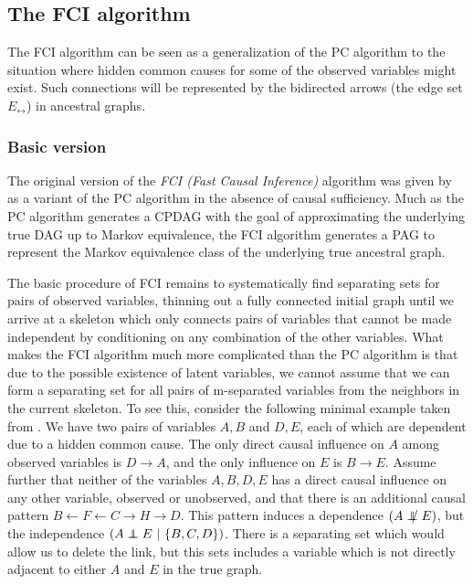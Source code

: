 \subsection{The FCI algorithm}
The FCI algorithm can be seen as a generalization of the PC algorithm to the situation where hidden common causes for some of the observed variables might exist. Such connections will be represented by the bidirected arrows (the edge set $E_\leftrightarrow$) in ancestral graphs.

\subsubsection{Basic version}
The original version of the \textit{FCI (Fast Causal Inference)} algorithm was given by \cite{spirtes_ea_2000} as a variant of the PC algorithm in the absence of causal sufficiency. Much as the PC algorithm generates a CPDAG with the goal of approximating the underlying true DAG up to Markov equivalence, the FCI algorithm generates a PAG to represent the Markov equivalence class of the underlying true ancestral graph.

The basic procedure of FCI remains to systematically find separating sets for pairs of observed variables, thinning out a fully connected initial graph until we arrive at a skeleton which only connects pairs of variables that cannot be made independent by conditioning on any combination of the other variables. What makes the FCI algorithm much more complicated than the PC algorithm is that due to the possible existence of latent variables, we cannot assume that we can form a separating set for all pairs of m-separated variables from the neighbors in the current skeleton. To see this, consider the following minimal example taken from \citet[p.129]{spirtes_ea_2000}. We have two pairs of variables $A,B$ and $D,E$, each of which are dependent due to a hidden common cause. The only direct causal influence on $A$ among observed variables is $D \rightarrow A$, and the only influence on $E$ is $B \rightarrow E$. Assume further that neither of the variables $A,B,D,E$ has a direct causal influence on any other 
variable, observed or unobserved, and that there is an additional causal pattern $B \leftarrow F \leftarrow C \rightarrow H \rightarrow D$. This pattern induces a dependence $(A \notindep E)$, but the independence $(A \indep E\ |\ \{B,C,D\})$. There is a separating set which would allow us to delete the link, but this sets includes a variable which is not directly adjacent to either $A$ and $E$ in the true graph.

